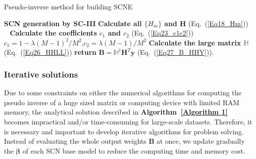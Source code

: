 \documentclass{article}
\begin{document}
{\centering
\begin{minipage}{0.8\linewidth}
\begin{algorithm}[H]
\SetAlgoLined
{}
\caption{Pseudo-inverse method for building SCNE}
\label{Algorithm 1}
\DontPrintSemicolon
{} 
\BlankLine
\textbf{SCN generation by SC-III}\;
\textbf{Calculate all $\{H_m\}$ and $\bm{H}$} (Eq.~(\ref{Eq18_Hm}))\;
\
\textbf{Calculate the coefficients $c_1$ and $c_2$} (Eq.~(\ref{Eq23_c1c2}))\; 
$c_1 = 1- \lambda(M-1)^2/M^2$,\quad $c_2 = \lambda(M-1)/M^2$\;
\textbf{Calculate the large matrix $\mathbb{H}$} (Eq.~(\ref{Eq26_HHLL}))\;
\textbf{return} $\bm{B}=\mathbb{H}^{\dagger}\bm{H}^T\bm{y}$ (Eq.~(\ref{Eq27_B_HHY})).
\end{algorithm}
\end{minipage}
\par
}\vspace{5mm}

\subsubsection{Iterative solutions}
Due to some constraints on either the numerical algorithms for computing the pseudo inverse of a huge sized matrix or computing device with limited RAM memory, the analytical solution described in \textbf{Algorithm~\ref{Algorithm 1}} becomes impractical and/or time-consuming for large-scale datasets.  Therefore, it is necessary and important to develop iterative algorithms for problem solving. Instead of evaluating the whole output weights $\bm{B}$ at once, we update gradually the $\bm{\beta}$ of each SCN base model to reduce the computing time and memory cost.  
\end{document}
